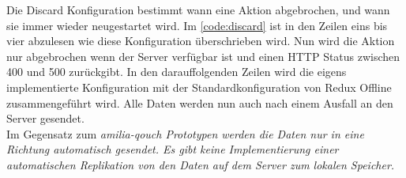 \begin{center}
  
\end{center}
Die Discard Konfiguration bestimmt wann eine Aktion abgebrochen, und wann sie immer wieder neugestartet wird. Im \autoref{code:discard} ist in den Zeilen eins bis vier abzulesen wie diese Konfiguration überschrieben wird. Nun wird die Aktion nur abgebrochen wenn der Server verfügbar ist und einen \gls{HTTP} Status zwischen 400 und 500 zurückgibt.
In den darauffolgenden Zeilen wird die eigens implementierte Konfiguration mit der Standardkonfiguration von Redux Offline zusammengeführt wird.
Alle Daten werden nun auch nach einem Ausfall an den Server gesendet.\\
Im Gegensatz zum \it{amilia-qouch} Prototypen werden die Daten nur in eine Richtung automatisch gesendet. Es gibt keine Implementierung einer automatischen Replikation von den Daten auf dem Server zum lokalen Speicher.